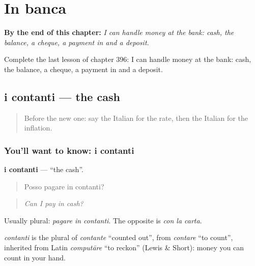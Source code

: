 
\chapter{In banca}
\label{ch:it-in-banca}

\begin{chapteropening}
\textbf{By the end of this chapter:} \emph{I can handle money at the bank: cash, the balance, a cheque, a payment in and a deposit.}

Complete the last lesson of chapter 396: I can handle money at the bank: cash, the balance, a cheque, a payment in and a deposit.
\end{chapteropening}

\section[i contanti]{i contanti — the cash}

\label{lesson:IT-C396-contanti}



\begin{quote}
Before the new one: say the Italian for the rate, then the Italian for the inflation.
\end{quote}

\subsection*{You'll want to know: i contanti}
\textbf{i contanti} — \textquotedblleft{}the cash\textquotedblright{}.

\begin{quote}
Posso pagare in contanti?
\end{quote}

\begin{quote}
\emph{Can I pay in cash?}
\end{quote}

Usually plural: \emph{pagare in contanti}. The opposite is \emph{con la carta}.

\begin{cousinweb}
\emph{contanti} is the plural of \emph{contante} \textquotedblleft{}counted out\textquotedblright{}, from \emph{contare} \textquotedblleft{}to count\textquotedblright{}, inherited from Latin \emph{computāre} \textquotedblleft{}to reckon\textquotedblright{} (Lewis \& Short): money you can count in your hand.
\end{cousinweb}

